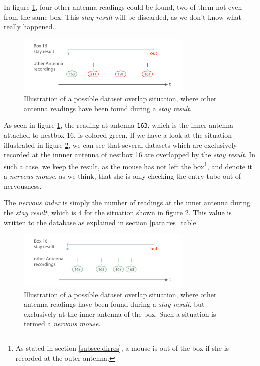 In figure \ref{fig:dataset_overlap}, four other antenna readings could be found, two of them not even from the same box. This \textit{stay result} will be discarded, as we don't know what really happened.

\begin{figure}[htpb]
\begin{center}
  \includegraphics[width=0.75\textwidth]{assets/pdf/dataset_overlap_schema.pdf}
  \caption[Dataset overlap situation]{Illustration of a possible dataset overlap situation, where other antenna readings have been found during a \textit{stay result}.}
  \label{fig:dataset_overlap}
\end{center}
\end{figure}

As seen in figure \ref{fig:dataset_overlap}, the reading at antenna \lstinline|163|, which is the inner antenna attached to nestbox 16, is colored green. If we have a look at the situation illustrated in figure \ref{fig:dataset_overlap_nervous}, we can see that several datasets which are exclusively recorded at the innner antenna of nestbox 16 are overlapped by the \textit{stay result}. In such a case, we keep the result, as the mouse has not left the box\footnote{As stated in section \ref{subsec:dirres}, a mouse is out of the box if she is recorded at the outer antenna.}, and denote it a \textit{nervous mouse}, as we think, that she is only checking the entry tube out of nervousness.

The \textit{nervous index} is simply the number of readings at the inner antenna during the \textit{stay result}, which is 4 for the situation shown in figure \ref{fig:dataset_overlap_nervous}. This value is written to the database as explained in section \ref{para:res_table}.

\begin{figure}[htpb]
\begin{center}
  \includegraphics[width=0.75\textwidth]{assets/pdf/dataset_overlap_nervous_schema.pdf}
  \caption[Dataset overlap situation for a \textit{nervous mouse}]{Illustration of a possible dataset overlap situation, where other antenna readings have been found during a \textit{stay result}, but exclusively at the inner antenna of the box. Such a situation is termed a \textit{nervous mouse}.}
  \label{fig:dataset_overlap_nervous}
\end{center}
\end{figure}

